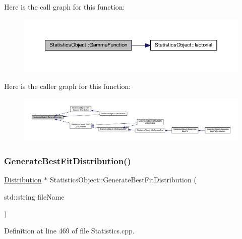 Here is the call graph for this function\+:\nopagebreak
\begin{figure}[H]
\begin{center}
\leavevmode
\includegraphics[width=350pt]{class_statistics_object_a0d9dc9480288e61b3e98134deb18d2d4_cgraph}
\end{center}
\end{figure}
Here is the caller graph for this function\+:\nopagebreak
\begin{figure}[H]
\begin{center}
\leavevmode
\includegraphics[width=350pt]{class_statistics_object_a0d9dc9480288e61b3e98134deb18d2d4_icgraph}
\end{center}
\end{figure}
\mbox{\label{class_statistics_object_a88d8c8b8fd57da4a08cf1d02d363abf1}} 
\subsubsection{\texorpdfstring{Generate\+Best\+Fit\+Distribution()}{GenerateBestFitDistribution()}}
{\footnotesize\ttfamily \hyperlink{class_distribution}{Distribution} $\ast$ Statistics\+Object\+::\+Generate\+Best\+Fit\+Distribution (\begin{DoxyParamCaption}\item[{std\+::string}]{file\+Name }\end{DoxyParamCaption})}



Definition at line 469 of file Statistics.\+cpp.

